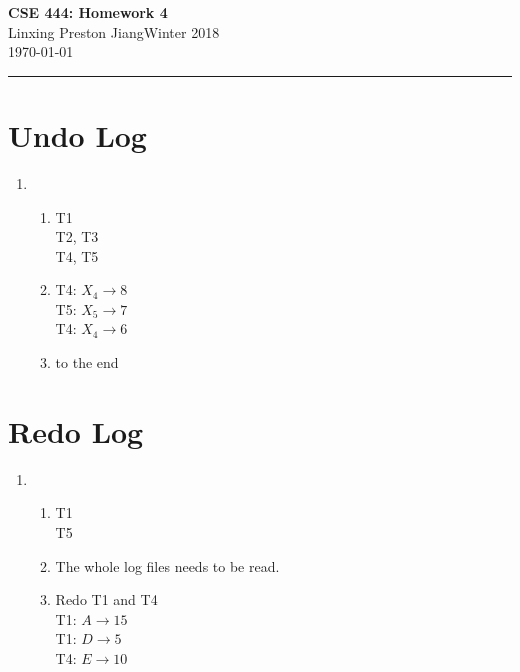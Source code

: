 \documentclass[10pt]{myland}
\renewcommand{\myname}{Linxing Preston Jiang}
\renewcommand{\quarter}{Winter 2018}
\renewcommand{\myhwname}{\textbf{CSE 444: Homework 4}}
\begin{document}
\begin{center}
	{\Large \myhwname} \\
	\vspace{.05in}
    \myname\quad\quarter\\
	\vspace{.05in}
    \today \\
\end{center}
\vspace{.15in} \hrule \vspace{0.5em}%

\section{Undo Log}
\begin{enumerate}
    \item
    \begin{enumerate}
        \item
         T1\\
         T2, T3\\
         T4, T5
        \item
            T4: $X_4 \to 8$ \\
            T5: $X_5 \to 7$ \\
            T4: $X_4 \to 6$
        \item <START T4> to the end
    \end{enumerate}
\end{enumerate}

\section{Redo Log}
\begin{enumerate}
    \item
    \begin{enumerate}
        \item
         T1\\
         T5
        \item The whole log files needs to be read.
        \item Redo T1 and T4 \\
            T1: $A \to 15$ \\
            T1: $D \to 5$ \\
            T4: $E \to 10$ \\
    \end{enumerate}
\end{enumerate}
\end{document}
